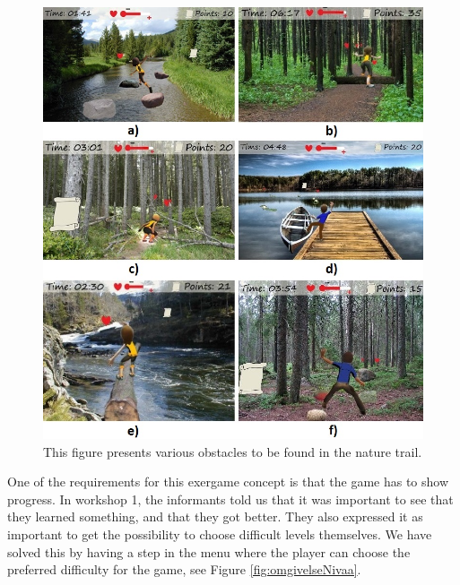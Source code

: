 \begin{figure} [H]
\centering
\includegraphics[scale=0.6]{hindringerEng.jpg}
\caption[Nature trail - obstacles]{This figure presents various obstacles to be found in the nature trail.}
\label{fig:hindring}
\end{figure}

One of the requirements for this exergame concept is that the game has to show progress. In workshop 1, the informants told us that it was important to see that they learned something, and that they got better. They also expressed it as important to get the possibility to choose difficult levels themselves. We have solved this by having a step in the menu where the player can choose the preferred difficulty for the game, see Figure \ref{fig:omgivelseNivaa}. 

